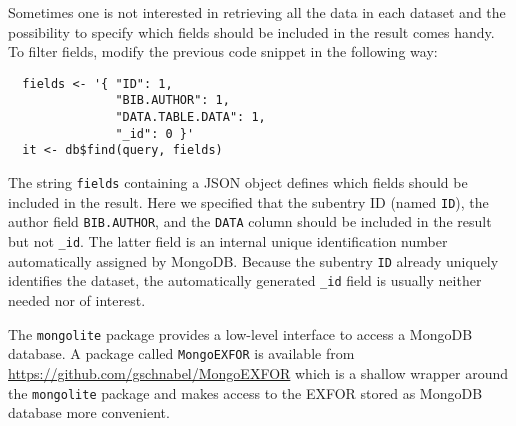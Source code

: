 \documentclass[12pt,a4paper]{scrartcl}
\begin{document}
Sometimes one is not interested in retrieving all the data in each dataset and the possibility to specify which fields should be included in the result comes handy.
To filter fields, modify the previous code snippet in the following way:
\begin{verbatim}
  fields <- '{ "ID": 1, 
               "BIB.AUTHOR": 1, 
               "DATA.TABLE.DATA": 1, 
               "_id": 0 }' 
  it <- db$find(query, fields)
\end{verbatim}
The string \verb|fields| containing a JSON object defines which fields should be included in the result.
Here we specified that the subentry ID (named \verb|ID|), the author field \verb|BIB.AUTHOR|, and the \verb|DATA| column should be included in the result but not \verb|_id|.
The latter field is an internal unique identification number automatically assigned by MongoDB.
Because the subentry \verb|ID| already uniquely identifies the dataset, the automatically generated \verb|_id| field is usually neither needed nor of interest.

The \verb|mongolite| package provides a low-level interface to access a MongoDB database.
A package called \verb|MongoEXFOR| is available from \url{https://github.com/gschnabel/MongoEXFOR} which is a shallow wrapper around the \verb|mongolite| package and makes access to the EXFOR stored as MongoDB database more convenient.
\end{document}
